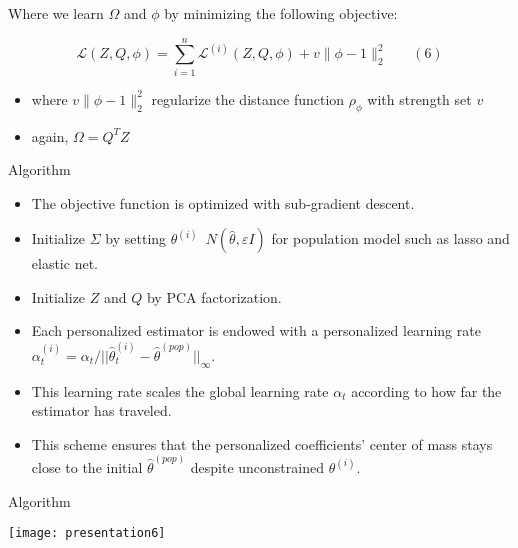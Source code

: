 \documentclass[
  10pt,
  ignorenonframetext,
]{beamer}
\begin{document}
\begin{frame}{}
\protect\hypertarget{section-1}{}
Where we learn \(\Omega\) and \(\phi\) by minimizing the following
objective:

\[
\pmb {\mathcal L} (Z, Q, \phi) = \sum^n_{i=1} \mathcal L^{(i)}(Z, Q, \phi) + v \|\phi - 1\|^2_2 \ \ \ \ \ \ \ \ (6)
\]

\tiny

\begin{itemize}
\item
  where \(v \|\phi - 1\|^2_2\) regularize the distance function
  \(\rho_\phi\) with strength set \(v\)
\item
  again, \(\Omega = Q^TZ\)
\end{itemize}
\end{frame}

\begin{frame}{Algorithm}
\protect\hypertarget{algorithm}{}
\begin{itemize}
\item The objective function is optimized with sub-gradient descent.
\item Initialize $\Sigma$ by setting $\theta^{(i)}$~$N(\hat\theta, \varepsilon I)$ for population model such as lasso and elastic net.
\item Initialize $Z$ and $Q$ by PCA factorization.
\item Each personalized estimator is endowed with a personalized learning rate $\alpha_t^{(i)} = \alpha_t / ||\hat \theta_t^{(i)} - \hat \theta^{(pop)}||_{\infty}$.
\item  This learning rate scales the global learning rate $\alpha_t$ according to how far the estimator has traveled.
\item This scheme ensures that the personalized coefficients' center of mass stays close to the initial $\hat \theta^{(pop)}$ despite unconstrained $\theta^{(i)}$.
\end{itemize}
\end{frame}

\begin{frame}{Algorithm}
\protect\hypertarget{algorithm-1}{}
\begin{center}\texttt{[image: presentation6]} \end{center}
\end{frame}
\end{document}
